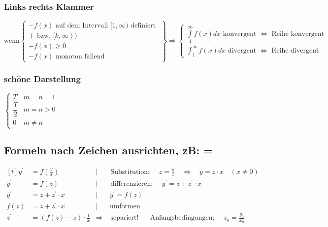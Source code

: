 		\subsubsection{Links rechts Klammer}
			$
			\text{wenn}
			\left.
			\begin{cases}
			{-f(x) \text { auf dem Intervall }[1, \infty) \text { definiert }} \\ 
			{(\text { bzw. }[k, \infty))} \\ 
			{-f(x) \geq 0}\\
			{-f(x) \text { monoton fallend }}
			\end{cases}\right\}
			\Rightarrow
			\begin{cases}{\int\limits_{1}^{\infty} f(x) d x \text { konvergent } \Leftrightarrow \text { Reihe konvergent }} \\ {\int_{1}^{\infty} f(x) d x \text { divergent } \Leftrightarrow \text { Reihe divergent }}\end{cases}
			$\\	
		
		\subsubsection{schöne Darstellung}
			\begin{math}			%
				\begin{cases}
				{T} & {m=n=1} \\[1.0em]
				{\dfrac{T}{2}} & {m=n>0} \\[1.0em]		%
				{0} & {m \neq n}
				\end{cases}
			\end{math}
	
	\subsection{Formeln nach Zeichen ausrichten, zB: =}
		$\begin{aligned}[t]
			y^{\prime} &=f\left(\frac{y}{x}\right) \quad
			&|& \text { Substitution: } \quad z=\frac{y}{x} \quad \Leftrightarrow \quad y=z \cdot x \quad(x \neq 0)\\ 
			y^{\prime} &=f(z) \quad &|& 
			\text { differenzieren: } \quad y^{\prime}=z+z^{\prime} \cdot x\\ 
			y^{\prime} &=z+z^{\prime} \cdot x \quad &|& \ y^{\prime}=f(z)\\ 
			f(z) &=z+z^{\prime} \cdot x \quad &|& \ \text{umformen}\\
			z^{\prime}&=(f(z)-z) \cdot \frac{1}{x} &\Rightarrow& \text { separiert! } \quad \text { Anfangsbedingungen: } \quad z_{o}=\frac{y_{0}}{x_{0}}\\
		\end{aligned}$\\
		
